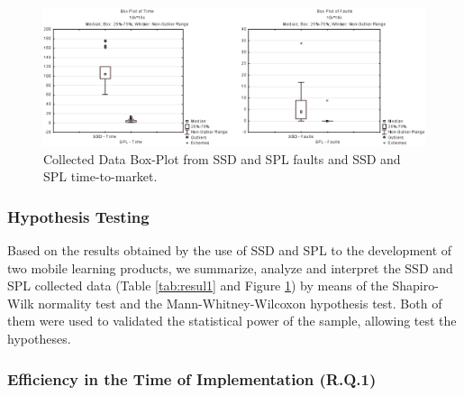 \begin{figure}[!ht]
\centering
\includegraphics[scale=1.0]{./figures/section4/boxplot.eps}
\centering
\caption{Collected Data Box-Plot from SSD and SPL faults and SSD and SPL time-to-market.}
\label{fig:boxplot}
\end{figure}


\subsubsection{Hypothesis Testing}




Based on the results obtained by the use of SSD and SPL to the development of two mobile learning products, we summarize, analyze and interpret the SSD and SPL collected data (Table \ref{tab:resul1} and Figure \ref{fig:boxplot}) by means of the Shapiro-Wilk normality test and the Mann-Whitney-Wilcoxon hypothesis test. Both of them were used to validated the statistical power of the sample, allowing test the hypotheses.





\subsubsection{Efficiency in the Time of Implementation (R.Q.1)}


